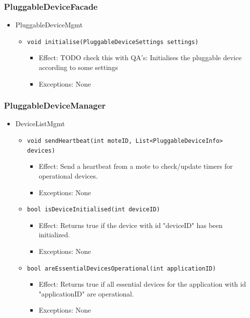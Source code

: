     \subsubsection{PluggableDeviceFacade}
        \begin{itemize}
        	\item PluggableDeviceMgmt
        	\begin{itemize}
                \item \texttt{void initialise(PluggableDeviceSettings settings)}
                \begin{itemize}
                    \item Effect: TODO check this with QA's: Initialises the pluggable device according to some settings
                    \item Exceptions: None
                \end{itemize}
        	\end{itemize}
        \end{itemize}

    \subsubsection{PluggableDeviceManager}
        \begin{itemize}
        	\item DeviceListMgmt
        	\begin{itemize}
        		\item \texttt{void sendHeartbeat(int moteID, List<PluggableDeviceInfo> devices)}
        		\begin{itemize}
        			\item Effect: Send a heartbeat from a mote to check/update timers for operational devices.
        			\item Exceptions: None
        		\end{itemize}
        		\item \texttt{bool isDeviceInitialised(int deviceID)}
        		\begin{itemize}
        			\item Effect: Returns true if the device with id "deviceID" has been initialized.
        			\item Exceptions: None
        		\end{itemize}
        		\item \texttt{bool areEssentialDevicesOperational(int applicationID)}
        		\begin{itemize}
        			\item Effect: Returns true if all essential devices for the application
                                  with id "applicationID" are operational.
        			\item Exceptions: None
        		\end{itemize}
        	\end{itemize}
        \end{itemize}


